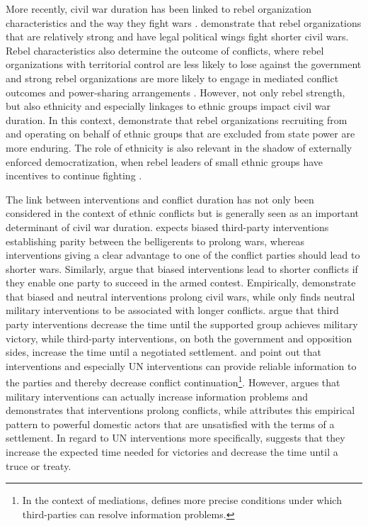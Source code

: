 \documentclass[11pt,oneside,fullpage]{amsart}
\begin{document}
More recently, civil war duration has been linked to rebel organization characteristics \citep{cunningham09} and the way they fight wars \citep{balcells2014does}. \citet{cunningham09} demonstrate that rebel organizations that are relatively strong and have legal political wings fight shorter civil wars. Rebel characteristics also determine the outcome of conflicts, where rebel organizations with territorial control are less likely to lose against the government \citep{cunningham09} and strong rebel organizations are more likely to engage in mediated conflict outcomes \citep{clayton2013relative} and power-sharing arrangements \citep{gent2011relative}. However, not only rebel strength, but also ethnicity \citep{montalvo2010ethnic} and especially linkages to ethnic groups impact civil war duration. In this context, \citet{jwnm:2012} demonstrate that rebel organizations recruiting from and operating on behalf of ethnic groups that are excluded from state power are more enduring. The role of ethnicity is also relevant in the shadow of externally enforced democratization, when rebel leaders of small ethnic groups have incentives to continue fighting \citep{nm:11}.

The link between interventions and conflict duration has not only been considered in the context of ethnic conflicts \citep{nm:11} but is generally seen as an important determinant of civil war duration. \citet{regan02} expects biased third-party interventions establishing parity between the belligerents to prolong wars, whereas interventions giving a clear advantage to one of the conflict parties should lead to shorter wars. Similarly, \citet{balch00} argue that biased interventions lead to shorter conflicts if they enable one party to succeed in the armed contest. Empirically, \citet{balch00} demonstrate that biased and neutral interventions prolong civil wars, while \citet{regan02} only finds neutral military interventions to be associated with longer conflicts. \citet{balch08} argue that third party interventions decrease the time until the supported group achieves military victory, while third-party interventions, on both the government and opposition sides, increase the time until a negotiated settlement. \citet{doyle06} and \citet{fortna08a} point out that interventions and especially UN interventions can provide reliable information to the parties and thereby decrease conflict continuation\footnote{In the context of mediations, \citet{kydd06} defines more precise conditions under which third-parties can resolve information problems.}. However, \citet{cunningham10} argues that military interventions can actually increase information problems and demonstrates that interventions prolong conflicts, while \citet{werner05} attributes this empirical pattern to powerful domestic actors that are unsatisfied with the terms of a settlement. In regard to UN interventions more specifically, \citet{derouen04} suggests that they increase the expected time needed for victories and decrease the time until a truce or treaty. 
\end{document}
